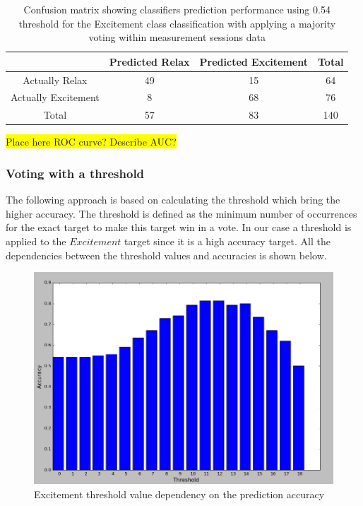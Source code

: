 \documentclass[12pt]{article}
\begin{document}
\begin{table}[H]
\caption{Confusion matrix showing classifiers prediction performance using 0.54 threshold for the Excitement class classification with applying a majority voting within measurement sessions data} \label{tab:title} 
\begin{center}
  \begin{tabular}{ | c | c | c | c | }
    \hline
     & Predicted Relax & Predicted Excitement & Total \\ \hline
    Actually Relax & 49 & 15 & 64 \\ \hline
    Actually Excitement & 8 & 68 & 76 \\ \hline
    Total & 57 & 83 & 140 \\ 
    \hline
  \end{tabular}
\end{center}
\end{table}

\colorbox{yellow}{Place here ROC curve? Describe AUC?}

\subsubsection{Voting with a threshold}

The following approach is based on calculating the threshold which bring the higher accuracy. The threshold is defined as the minimum number of occurrences for the exact target to make this target win in a vote. In our case a threshold is applied to the $Excitement$ target since it is a high accuracy target. All the dependencies between the threshold values and accuracies is shown below.

\begin{figure} [H]
\begin{center}
\includegraphics[width=1\textwidth]{threshold_accuracy_curve}
\caption{Excitement threshold value dependency on the prediction accuracy}
\label{fig:fnCompModel}
\end{center}
\end{figure}
\end{document}
